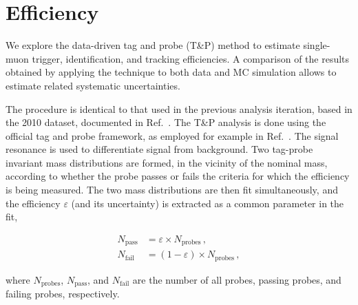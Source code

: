 \chapter{Efficiency}

We explore the data-driven tag and probe (T\&P) method to estimate single-muon trigger, identification, and tracking efficiencies. 
A comparison of the results obtained by applying the technique to both data and MC simulation allows to estimate related systematic uncertainties. 

The procedure is identical to that used in the previous analysis iteration, based in the 2010 \PbPb dataset, documented in Ref.~\cite{CMS_AN_2011_062}. 
The T\&P analysis is done using the official tag and probe framework, %
as employed for example in Ref.~\cite{CMS_AN_2011_062, CMS_AN_2010-140}. 
The \Jpsi signal resonance is used to differentiate signal from background. 
Two tag-probe invariant mass distributions are formed, in the vicinity of the \Jpsi nominal mass, according to whether the probe passes or fails the criteria for which the efficiency is being measured.  
The two mass distributions are then fit simultaneously, and the efficiency $\varepsilon$ (and its uncertainty) is extracted as a common parameter in the fit, 
%
\begin{linenomath}
\begin{align}
  N_{\text{pass}} &= \varepsilon \times N_{\text{probes}} \,,\\
  N_{\text{fail}} &= (1 - \varepsilon ) \times N_{\text{probes}} \,,\nonumber
\end{align}
\end{linenomath}
%
where $N_{\text{probes}}$, $N_{\text{pass}}$, and $N_{\text{fail}}$
are the number of all probes, passing probes, and failing probes, respectively. 


